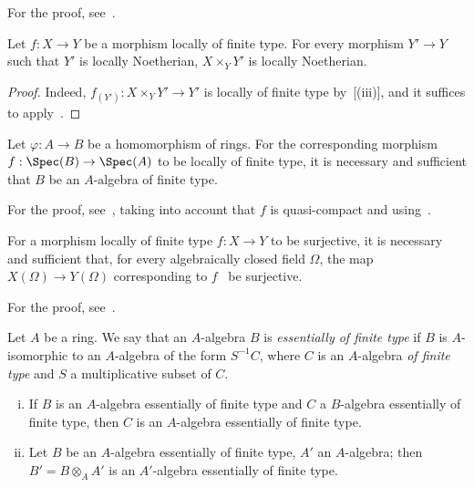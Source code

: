 For the proof, see~.

\begin{corollary}[1.3.5]
\label{IV.1.3.5}
Let $f:X\to Y$ be a morphism locally of finite type. For every
morphism $Y'\to Y$ such that $Y'$ is locally Noetherian, $X\times_Y Y'$ is locally Noetherian.
\end{corollary}

\begin{proof}
Indeed, $f_{(Y')}:X\times_Y Y'\to Y'$ is locally of finite type by~[(iii)], and it
suffices to apply~.
\end{proof}

\begin{proposition}[1.3.6]
\label{IV.1.3.6}
Let $\varphi:A\to B$ be a homomorphism of rings. For the
corresponding morphism $f:\Spec(B)\to\Spec(A)$ to be locally of finite type, it is necessary and sufficient
that $B$ be an $A$-algebra of finite type.
\end{proposition}

For the proof, see~, taking into account that $f$ is quasi-compact and using~.

\begin{proposition}[1.3.7]
\label{IV.1.3.7}
For a morphism locally of finite type $f:X\to Y$ to be
surjective, it is necessary and sufficient that, for every algebraically closed field $\Omega$, the map $X(\Omega)\to Y(\Omega)$
corresponding to $f$~ be surjective.
\end{proposition}

For the proof, see~.

\begin{env}[1.3.8]
\label{IV.1.3.8}
Let $A$ be a ring. We say that an $A$-algebra $B$ is \emph{essentially of finite type}
if $B$ is $A$-isomorphic to an $A$-algebra of the form $S^{-1}C$, where $C$ is an $A$-algebra \emph{of
finite type} and $S$ a multiplicative subset of $C$.
\end{env}

\begin{proposition}[1.3.9]
\label{IV.1.3.9}
\medskip\noindent
\begin{enumerate}[(i)]
  \item If $B$ is an $A$-algebra essentially of finite type and $C$
    a $B$-algebra essentially of finite type, then $C$ is an $A$-algebra essentially of finite type.
  \item Let $B$ be an $A$-algebra essentially of finite type, $A'$ an $A$-algebra; then $B'=B\otimes_A A'$
    is an $A'$-algebra essentially of finite type.
\end{enumerate}
\end{proposition}

